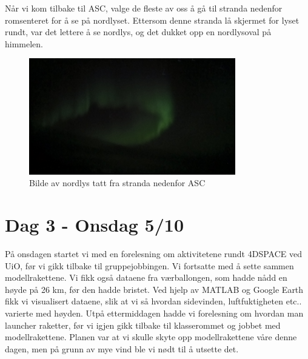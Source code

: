 \documentclass[norsk,a4paper,12pt]{article}
\begin{document}
N{\aa}r vi kom tilbake til ASC, valge de fleste av oss {\aa} g{\aa} til stranda nedenfor romsenteret for {\aa} se p{\aa} nordlyset. Ettersom denne stranda l{\aa} skjermet for lyset rundt, var det lettere {\aa} se nordlys, og det dukket opp en nordlysoval p{\aa} himmelen.

\begin{figure}[H]
\centering
\includegraphics[width=90mm]{lightoval.jpg}
\caption{Bilde av nordlys tatt fra stranda nedenfor ASC \label{overflow}}
\end{figure}

\section*{Dag 3 - Onsdag 5/10}
P{\aa} onsdagen startet vi med en forelesning om aktivitetene rundt 4DSPACE ved UiO, f{\o}r vi gikk tilbake til gruppejobbingen. Vi fortsatte med {\aa} sette sammen modellrakettene. Vi fikk ogs{\aa} dataene fra v{\ae}rballongen, som hadde n{\aa}dd en h{\o}yde p{\aa} 26 km, f{\o}r den hadde bristet. Ved hjelp av MATLAB og Google Earth fikk vi visualisert dataene, slik at vi s{\aa} hvordan sidevinden, luftfuktigheten etc.. varierte med h{\o}yden. Utp{\aa} ettermiddagen hadde vi forelesning om hvordan man launcher raketter, f{\o}r vi igjen gikk tilbake til klasserommet og jobbet med modellrakettene. Planen var at vi skulle skyte opp modellrakettene v{\aa}re denne dagen, men p{\aa} grunn av mye vind ble vi n{\o}dt til {\aa} utsette det. 
\end{document}
